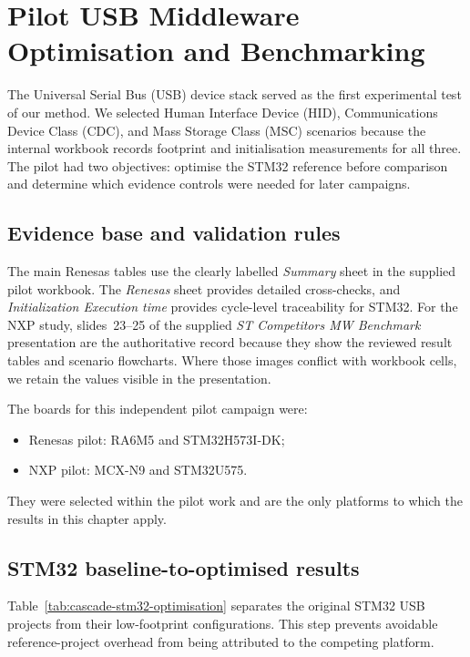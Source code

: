\chapter{Pilot USB Middleware Optimisation and Benchmarking}
\label{chap:cascade-usb-pilot}

The Universal Serial Bus (USB) device stack served as the first experimental test of our
method. We selected Human Interface Device (HID), Communications Device Class (CDC), and
Mass Storage Class (MSC) scenarios because the internal workbook records footprint and
initialisation measurements for all three. The pilot had two objectives: optimise the STM32
reference before comparison and determine which evidence controls were needed for later
campaigns.

\section{Evidence base and validation rules}
\label{sec:cascade-pilot-evidence}

The main Renesas tables use the clearly labelled \emph{Summary} sheet in the supplied pilot
workbook. The \emph{Renesas} sheet provides detailed cross-checks, and
\emph{Initialization Execution time} provides cycle-level traceability for STM32. For the
NXP study, slides~23--25 of the supplied \emph{ST Competitors MW Benchmark} presentation
are the authoritative record because they show the reviewed result tables and scenario
flowcharts. Where those images conflict with workbook cells, we retain the values visible
in the presentation.

The boards for this independent pilot campaign were:
\begin{itemize}
\item Renesas pilot: RA6M5 and STM32H573I-DK;
\item NXP pilot: MCX-N9 and STM32U575.
\end{itemize}
They were selected within the pilot work and are the only platforms to which the results in
this chapter apply.

\section{STM32 baseline-to-optimised results}
\label{sec:cascade-stm32-optimisation}

Table~\ref{tab:cascade-stm32-optimisation} separates the original STM32 USB projects from
their low-footprint configurations. This step prevents avoidable reference-project overhead
from being attributed to the competing platform.

